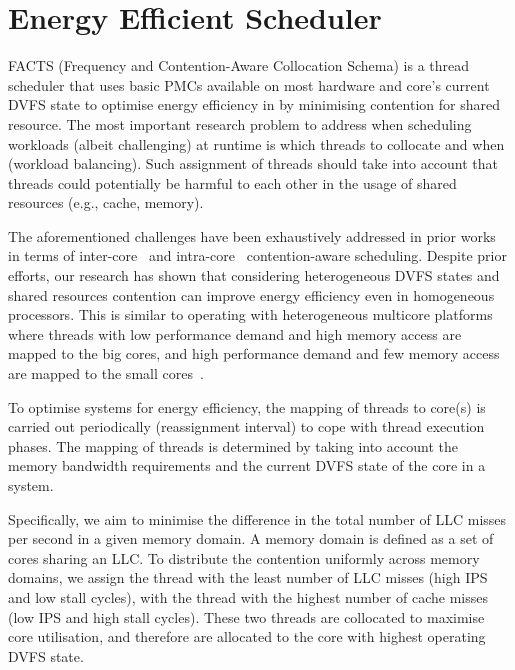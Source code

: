 \section{Energy Efficient Scheduler}
\label{sec: facts} 


 FACTS (Frequency and Contention-Aware Collocation Schema) is a thread
scheduler that uses basic PMCs available on most hardware and core's current DVFS state to
optimise energy efficiency in \muc \archs by minimising contention for shared resource.
The most important research problem to address when scheduling workloads (albeit
challenging) at runtime is which threads to collocate and when (workload balancing). Such
assignment of threads should take into account that threads could potentially be harmful
to each other in the usage of shared resources (e.g., cache, memory). 

The aforementioned challenges have been exhaustively addressed in prior works in terms of
inter-core~\citep{Blagodurov:2010:CSM:1880018.1880019, Mars2013Whare-map, Mars:2011:BIU:2155620.2155650, Yang2013Bubble-flux} and intra-core~\citep{yingxin,
Nishtala:2013:ETC:2555754.2555775} contention-aware scheduling.  Despite prior efforts,
our research has shown that considering heterogeneous DVFS states and shared resources
contention can improve energy efficiency even in homogeneous \muc processors. This is
similar to operating with heterogeneous multicore platforms where threads with low
performance demand and high memory access are mapped to the big cores, and high
performance demand and few memory access are mapped to the small
cores~\citep{Nishtala:2013:ETC:2555754.2555775, Petrucci:2012:LSE:2387869.2387876, Petrucci:2012:TAO:2224483.2225012}.

 To optimise \muc systems for energy efficiency, the mapping of threads to
core(s) is carried out periodically (reassignment interval) to cope with thread execution
phases. The mapping of threads is determined by taking into account the memory bandwidth
requirements and the current DVFS state of the core in a \muc system.  

Specifically, we aim to minimise the difference in the total number of LLC misses per
second in a given memory domain. A memory domain is defined as a set of cores sharing an
LLC.  To distribute the contention uniformly across memory domains, we assign the thread
with the least number of LLC misses (high IPS and low stall cycles), with the thread
with the highest number of cache misses (low IPS and high stall cycles).  These two threads are collocated to maximise core
utilisation, and therefore are allocated to the core with highest operating DVFS state.

